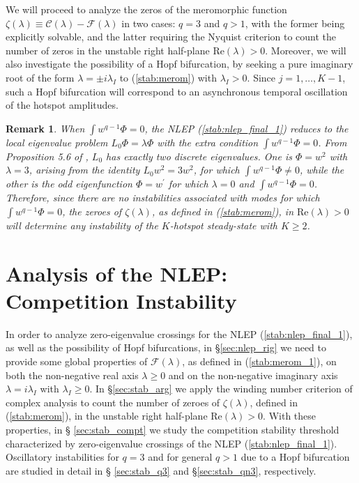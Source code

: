 \documentclass{article}%
\newtheorem{rem}[theorem]{Remark}
\begin{document}
We will proceed to analyze the zeros of the meromorphic function
$\zeta(\lambda)\equiv \mathcal{C}(\lambda)-\mathcal{F}(\lambda)$ in
two cases: $q=3$ and $q>1$, with the former being explicitly solvable,
and the latter requiring the Nyquist criterion to count the number of
zeros in the unstable right half-plane
$\mbox{Re}(\lambda)>0$. Moreover, we will also investigate the
possibility of a Hopf bifurcation, by seeking a pure imaginary root of
the form $\lambda=\pm i\lambda_{I}$ to (\ref{stab:merom}) with
$\lambda_{I}>0$. Since $j=1,\ldots,K-1$, such a Hopf bifurcation will
correspond to an asynchronous temporal oscillation of the hotspot
amplitudes.

\begin{rem}
When $\int w^{q-1}\Phi=0$, the NLEP (\ref{stab:nlep_final_1}) reduces
to the local eigenvalue problem $L_{0}\Phi=\lambda\Phi$ with the extra
condition $\int w^{q-1}\Phi=0$.  From Proposition 5.6 of \cite{dgk_0},
$L_0$ has exactly two discrete eigenvalues. One is $\Phi=w^2$
with $\lambda=3$, arising from the identity $L_0 w^2=3w^2$, for which
$\int w^{q-1}\Phi\neq 0$, while the other is the odd eigenfunction
$\Phi=w^{\prime}$ for which $\lambda=0$ and $\int
w^{q-1}\Phi=0$. Therefore, since there are no instabilities associated
with modes for which $\int w^{q-1}\Phi=0$, the zeroes of
$\zeta(\lambda)$, as defined in (\ref{stab:merom}), in
$\mbox{Re}(\lambda)>0$ will determine any instability of the
$K$-hotspot steady-state with $K\geq 2$.
\end{rem}

\setcounter{equation}{0}
\setcounter{section}{3}
\section{Analysis of the NLEP: Competition Instability}\label{sec:stab_comp}

In order to analyze zero-eigenvalue crossings for the NLEP
(\ref{stab:nlep_final_1}), as well as the possibility of Hopf
bifurcations, in \S \ref{sec:nlep_rig} we need to provide some global
properties of ${\mathcal F}(\lambda)$, as defined in
(\ref{stab:merom_1}), on both the non-negative real axis $\lambda\geq
0$ and on the non-negative imaginary axis $\lambda=i\lambda_I$ with
$\lambda_I\geq 0$.  In \S \ref{sec:stab_arg} we apply the winding
number criterion of complex analysis to count the number of zeroes of
$\zeta(\lambda)$, defined in (\ref{stab:merom}), in the unstable right
half-plane $\mbox{Re}(\lambda)>0$.  With these properties, in \S
\ref{sec:stab_compt} we study the competition stability threshold
characterized by zero-eigenvalue crossings of the NLEP
(\ref{stab:nlep_final_1}). Oscillatory instabilities for $q=3$ and for
general $q>1$ due to a Hopf bifurcation are studied in detail in \S
\ref{sec:stab_q3} and \S \ref{sec:stab_qn3}, respectively.
\end{document}
